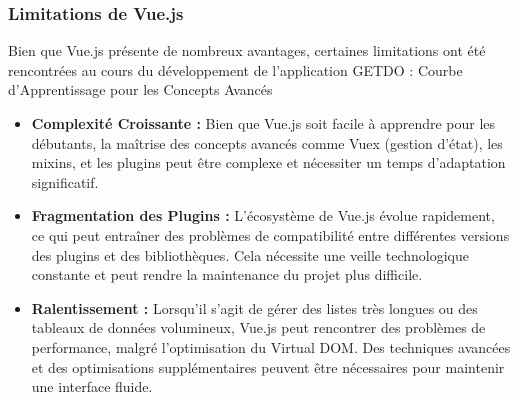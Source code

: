 \documentclass[a4paper,12pt]{report}
\begin{document}
    \subsubsection{Limitations de Vue.js}
    Bien que Vue.js présente de nombreux avantages, certaines limitations ont été rencontrées au  cours du développement de l'application GETDO :
    Courbe d'Apprentissage pour les Concepts Avancés

    \begin{itemize}
      \item\textbf{Complexité Croissante :} Bien que Vue.js soit facile à apprendre pour les débutants, la maîtrise des concepts avancés comme Vuex (gestion d'état), les mixins, et les plugins peut être complexe et nécessiter un temps d'adaptation significatif.

      \item\textbf{Fragmentation des Plugins :} L'écosystème de Vue.js évolue rapidement, ce qui peut entraîner des problèmes de compatibilité entre différentes versions des plugins et des bibliothèques. Cela nécessite une veille technologique constante et peut rendre la maintenance du projet plus difficile.

      \item\textbf{Ralentissement :} Lorsqu'il s'agit de gérer des listes très longues ou des tableaux de données volumineux, Vue.js peut rencontrer des problèmes de performance, malgré l'optimisation du Virtual DOM. Des techniques avancées et des optimisations supplémentaires peuvent être nécessaires pour maintenir une interface fluide.
     \end{itemize}
     
\end{document}
